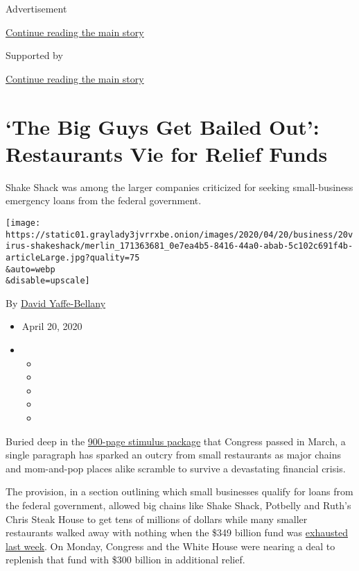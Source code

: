 Advertisement

\protect\hyperlink{after-top}{Continue reading the main story}

Supported by

\protect\hyperlink{after-sponsor}{Continue reading the main story}

\hypertarget{the-big-guys-get-bailed-out-restaurants-vie-for-relief-funds}{%
\section{`The Big Guys Get Bailed Out': Restaurants Vie for Relief
Funds}\label{the-big-guys-get-bailed-out-restaurants-vie-for-relief-funds}}

Shake Shack was among the larger companies criticized for seeking
small-business emergency loans from the federal government.

\texttt{[image: https://static01.graylady3jvrrxbe.onion/images/2020/04/20/business/20virus-shakeshack/merlin\_171363681\_0e7ea4b5-8416-44a0-abab-5c102c691f4b-articleLarge.jpg?quality=75\\\&auto=webp\\\&disable=upscale]}

By \href{http://www.nytimes3xbfgragh.onion/by/david-yaffe-bellany}{David
Yaffe-Bellany}

\begin{itemize}
\item
  April 20, 2020
\item
  \begin{itemize}
  \item
  \item
  \item
  \item
  \item
  \end{itemize}
\end{itemize}

Buried deep in the
\href{https://assets.documentcloud.org/documents/20059055/final-final-cares-act.pdf}{900-page
stimulus package} that Congress passed in March, a single paragraph has
sparked an outcry from small restaurants as major chains and mom-and-pop
places alike scramble to survive a devastating financial crisis.

The provision, in a section outlining which small businesses qualify for
loans from the federal government, allowed big chains like Shake Shack,
Potbelly and Ruth's Chris Steak House to get tens of millions of dollars
while many smaller restaurants walked away with nothing when the \$349
billion fund was
\href{https://www.nytimes3xbfgragh.onion/2020/04/16/business/coronavirus-sba-loans-out-of-money.html}{exhausted
last week}. On Monday, Congress and the White House were nearing a deal
to replenish that fund with \$300 billion in additional relief.

